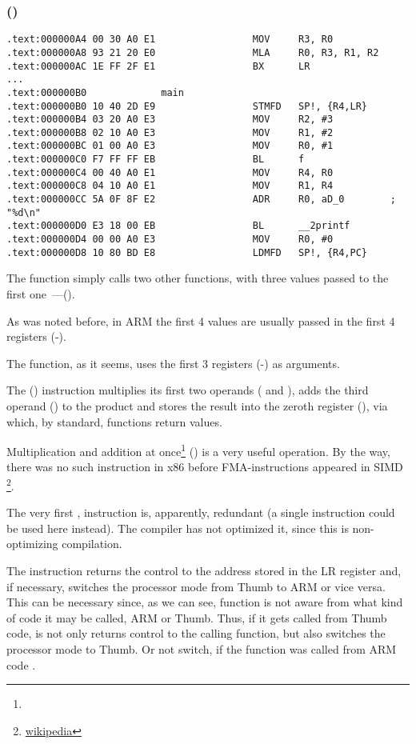 \subsubsection{\NonOptimizingKeilVI (\ARMMode)}

\begin{lstlisting}
.text:000000A4 00 30 A0 E1                 MOV     R3, R0
.text:000000A8 93 21 20 E0                 MLA     R0, R3, R1, R2
.text:000000AC 1E FF 2F E1                 BX      LR
...
.text:000000B0             main
.text:000000B0 10 40 2D E9                 STMFD   SP!, {R4,LR}
.text:000000B4 03 20 A0 E3                 MOV     R2, #3
.text:000000B8 02 10 A0 E3                 MOV     R1, #2
.text:000000BC 01 00 A0 E3                 MOV     R0, #1
.text:000000C0 F7 FF FF EB                 BL      f
.text:000000C4 00 40 A0 E1                 MOV     R4, R0
.text:000000C8 04 10 A0 E1                 MOV     R1, R4
.text:000000CC 5A 0F 8F E2                 ADR     R0, aD_0        ; "%d\n"
.text:000000D0 E3 18 00 EB                 BL      __2printf
.text:000000D4 00 00 A0 E3                 MOV     R0, #0
.text:000000D8 10 80 BD E8                 LDMFD   SP!, {R4,PC}
\end{lstlisting}

The \main function simply calls two other functions, with three values passed to the 
first one~---(\ttf).

As was noted before, in ARM the first 4 values are usually passed in the first 4 registers (-).

The \ttf function, as it seems, uses the first 3 registers (-) as arguments.

The  () 
instruction multiplies its first two operands ( and ), adds the third operand () to the product and stores
the result into the zeroth register (), via which, by standard, functions return values.

Multiplication and addition at once\footnote{\WPMAO} () 
is a very useful operation. By the way, there was no such instruction in x86 
before FMA-instructions appeared in SIMD
\footnote{\href{http://go.yurichev.com/17103}{wikipedia}}.

The very first , 
instruction is, apparently, redundant (a single  instruction could be used here instead). 
The compiler has not optimized it, since this is non-optimizing compilation.


The  instruction returns the control to the address stored in the \ac{LR} register and, if necessary, 
switches the processor mode from Thumb to ARM or vice versa.
This can be necessary since, as we can see, function \ttf is not aware from what kind of code it may be
called, ARM or Thumb.
Thus, if it gets called from Thumb code, 
 is not only returns control to the calling function,
but also switches the processor mode to Thumb.
Or not switch, if the function was called from ARM code .
